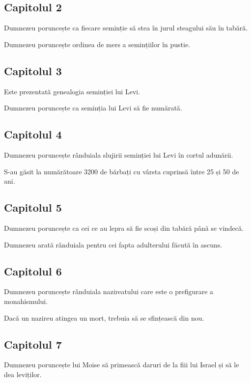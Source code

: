 \documentclass[12pt,a4paper]{article}
\begin{document}
\subsection{Capitolul 2}

Dumnezeu poruncește ca fiecare seminție să stea în jurul steagului său în tabără.

Dumnezeu poruncește ordinea de mers a semințiilor în pustie.

\subsection{Capitolul 3}

Este prezentată genealogia seminției lui Levi.

Dumnezeu poruncește ca seminția lui Levi să fie numărată.



\subsection{Capitolul 4}

Dumnezeu poruncește rânduiala slujirii seminției lui Levi în cortul adunării.

S-au găsit la numărătoare 3200 de bărbați cu vârsta cuprinsă între 25 și 50 de ani.

\subsection{Capitolul 5}

Dumnezeu poruncește ca cei ce au lepra să fie scoși din tabără până se vindecă.

Dumnezeu arată rânduiala pentru cei fapta adulterului făcută în ascuns.

\subsection{Capitolul 6}

Dumnezeu poruncește rânduiala nazireatului care este o prefigurare a monahismului.

Dacă un nazireu atingea un mort, trebuia să se sfințească din nou.

\subsection{Capitolul 7}

Dumnezeu poruncește lui Moise să primească daruri de la fiii lui Israel și să le dea leviților.
\end{document}
